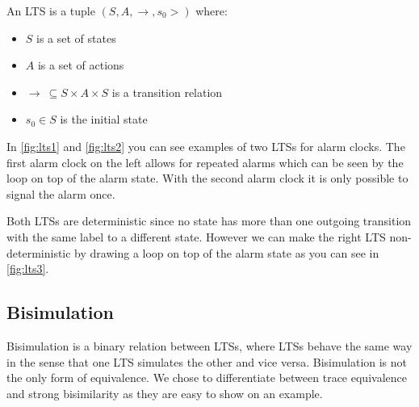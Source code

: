 \documentclass{clseminar}
\begin{document}
  An LTS is a tuple $(S, A, \to,s_0>)$ where: \\

  \begin{itemize}[noitemsep]
    \item $S$ is a set of states \\
    \item $A$ is a set of actions \\
    \item $\to\ \subseteq S \times A \times S$ is a transition relation \\
    \item $s_0 \in S$ is the initial state \\
  \end{itemize}

  \begin{figure}[!ht]
    \begin{minipage}{.5\linewidth}
      \centering
      
      \label{fig:lts1}
    \end{minipage}
    \begin{minipage}{.5\linewidth}
      \centering
      
      \label{fig:lts2}
    \end{minipage}
  \end{figure}

  In \autoref{fig:lts1} and \autoref{fig:lts2} you can see examples of two LTSs for alarm clocks. The first alarm clock on the left allows for repeated alarms which can be seen by the loop on top of the alarm state. With the second alarm clock it is only possible to signal the alarm once.

  Both LTSs are deterministic since no state has more than one outgoing transition with the same label to a different state. However we can make the right LTS non-deterministic by drawing a loop on top of the alarm state as you can see in \autoref{fig:lts3}. \\

  \begin{figure}[!ht]
    \centering
    
    \caption{}
    \label{fig:lts3}
  \end{figure}

  \subsection{Bisimulation}
  Bisimulation is a binary relation between LTSs, where LTSs behave the same way in the sense
  that one LTS simulates the other and vice versa. \cite{bisimulation_wiki} Bisimulation is not the only form of equivalence. We chose to differentiate between trace equivalence and strong bisimilarity as they are easy to show on an example.
\end{document}
